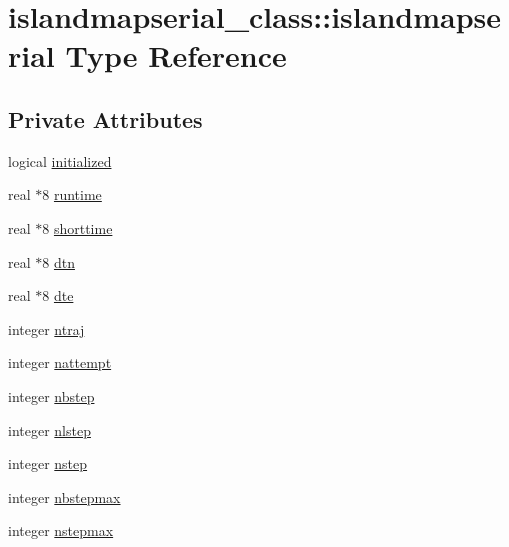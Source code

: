 \hypertarget{structislandmapserial__class_1_1islandmapserial}{\section{islandmapserial\+\_\+class\+:\+:islandmapserial Type Reference}
\label{structislandmapserial__class_1_1islandmapserial}
}
\subsection*{Private Attributes}
\begin{DoxyCompactItemize}
\item 
logical \hyperlink{structislandmapserial__class_1_1islandmapserial_a0ceb062c2ae3711ea9280ce29243fc87}{initialized}
\item 
real $\ast$8 \hyperlink{structislandmapserial__class_1_1islandmapserial_a8a69633f0f6b8b8978369702e7135782}{runtime}
\item 
real $\ast$8 \hyperlink{structislandmapserial__class_1_1islandmapserial_a2131d18b606e03ec9535bee28a66d8ed}{shorttime}
\item 
real $\ast$8 \hyperlink{structislandmapserial__class_1_1islandmapserial_ab2727d3f4d9e55f3145aa92cf7c30529}{dtn}
\item 
real $\ast$8 \hyperlink{structislandmapserial__class_1_1islandmapserial_a6e908914faee693ad8e0f0fd154576a0}{dte}
\item 
integer \hyperlink{structislandmapserial__class_1_1islandmapserial_a0dfda916fd4f1384681cfeeec9f21e46}{ntraj}
\item 
integer \hyperlink{structislandmapserial__class_1_1islandmapserial_aa2bfbfed9a4c620a455c343aac5504cc}{nattempt}
\item 
integer \hyperlink{structislandmapserial__class_1_1islandmapserial_ab668fed54e03d59502efbb63c5d93361}{nbstep}
\item 
integer \hyperlink{structislandmapserial__class_1_1islandmapserial_aad15f2ac1cf91bbde7bec0fd86073127}{nlstep}
\item 
integer \hyperlink{structislandmapserial__class_1_1islandmapserial_a79a0374a20a4f88cad7bfdbad3febeaf}{nstep}
\item 
integer \hyperlink{structislandmapserial__class_1_1islandmapserial_ab35e81e8c0b72b0aa6ebeed60058f793}{nbstepmax}
\item 
integer \hyperlink{structislandmapserial__class_1_1islandmapserial_ab7fc6db568c75c815804e3dee791495c}{nstepmax}

\end{DoxyCompactItemize}
